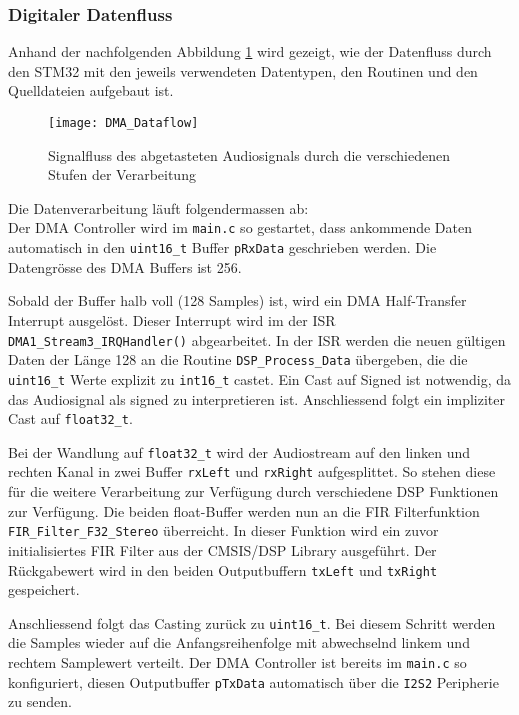 \subsubsection{Digitaler Datenfluss}
\label{sec:Dataflow}

Anhand der nachfolgenden Abbildung \ref{pic:DMA_Dataflow} wird gezeigt, wie der Datenfluss durch den STM32 mit den jeweils verwendeten Datentypen, den Routinen und den Quelldateien aufgebaut ist.

\begin{figure}[H]
	\centering
	\texttt{[image: DMA\_Dataflow]}
	\caption{Signalfluss des abgetasteten Audiosignals durch die verschiedenen Stufen der Verarbeitung}
	\label{pic:DMA_Dataflow}
\end{figure}

Die Datenverarbeitung läuft folgendermassen ab:\\

Der DMA Controller wird im \texttt{main.c} so gestartet, dass ankommende Daten automatisch in den \texttt{uint16\_t} Buffer \texttt{pRxData} geschrieben werden. Die Datengrösse des DMA Buffers ist 256. 

Sobald der Buffer halb voll (128 Samples) ist, wird ein DMA Half-Transfer Interrupt ausgelöst.
Dieser Interrupt wird im der ISR \texttt{DMA1\_Stream3\_IRQHandler()} abgearbeitet. 
In der ISR werden die neuen gültigen Daten der Länge 128 an die Routine \texttt{DSP\_Process\_Data} übergeben, die die \texttt{uint16\_t} Werte explizit zu \texttt{int16\_t} castet. Ein Cast auf Signed ist notwendig, da das Audiosignal als signed zu interpretieren ist. Anschliessend folgt ein impliziter Cast auf \texttt{float32\_t}.

Bei der Wandlung auf \texttt{float32\_t} wird der Audiostream auf den linken und rechten Kanal in zwei Buffer \texttt{rxLeft} und \texttt{rxRight} aufgesplittet.
So stehen diese für die weitere Verarbeitung zur Verfügung durch verschiedene DSP Funktionen zur Verfügung.
Die beiden float-Buffer werden nun an die FIR Filterfunktion \texttt{FIR\_Filter\_F32\_Stereo} überreicht. In dieser Funktion wird ein zuvor initialisiertes FIR Filter aus der CMSIS/DSP Library ausgeführt.
Der Rückgabewert wird in den beiden Outputbuffern \texttt{txLeft} und \texttt{txRight} gespeichert.

Anschliessend folgt das Casting zurück zu \texttt{uint16\_t}. Bei diesem Schritt werden die Samples wieder auf die Anfangsreihenfolge mit abwechselnd linkem und rechtem Samplewert verteilt.
Der DMA Controller ist bereits im \texttt{main.c} so konfiguriert, diesen Outputbuffer \texttt{pTxData} automatisch über die \texttt{I2S2} Peripherie zu senden.

